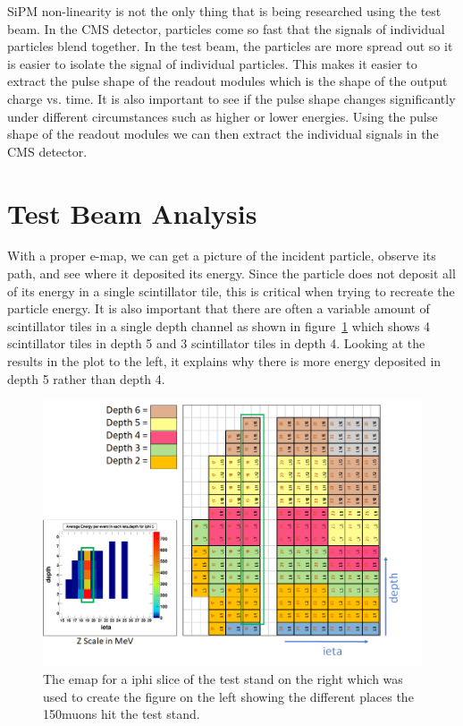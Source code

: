 SiPM non-linearity is not the only thing that is being researched using the test beam. In the CMS detector, particles come so fast that the signals of individual particles blend together. In the test beam, the particles are more spread out so it is easier to isolate the signal of individual particles. This makes it easier to extract the pulse shape of the readout modules which is the shape of the output charge vs. time. It is also important to see if the pulse shape changes significantly under different circumstances such as higher or lower energies. Using the pulse shape of the readout modules we can then extract the individual signals in the CMS detector.

\section{Test Beam Analysis}

With a proper e-map, we can get a picture of the incident particle, observe its path, and see where it deposited its energy. Since the particle does not deposit all of its energy in a single scintillator tile, this is critical when trying to recreate the particle energy. It is also important that there are often a variable amount of scintillator tiles in a single depth channel as shown in figure~\ref{fig:emap} which shows 4 scintillator tiles in depth 5 and 3 scintillator tiles in depth 4. Looking at the results in the plot to the left, it explains why there is more energy deposited in depth 5 rather than depth 4. 

\begin{figure}
\centering
\includegraphics[width=\linewidth]{Figures/eplot.png}
\caption{The emap for a iphi slice of the test stand on the right which was used to create the figure on the left showing the different places the 150\GeV\space muons hit the test stand.}
\label{fig:emap}
\end{figure}

